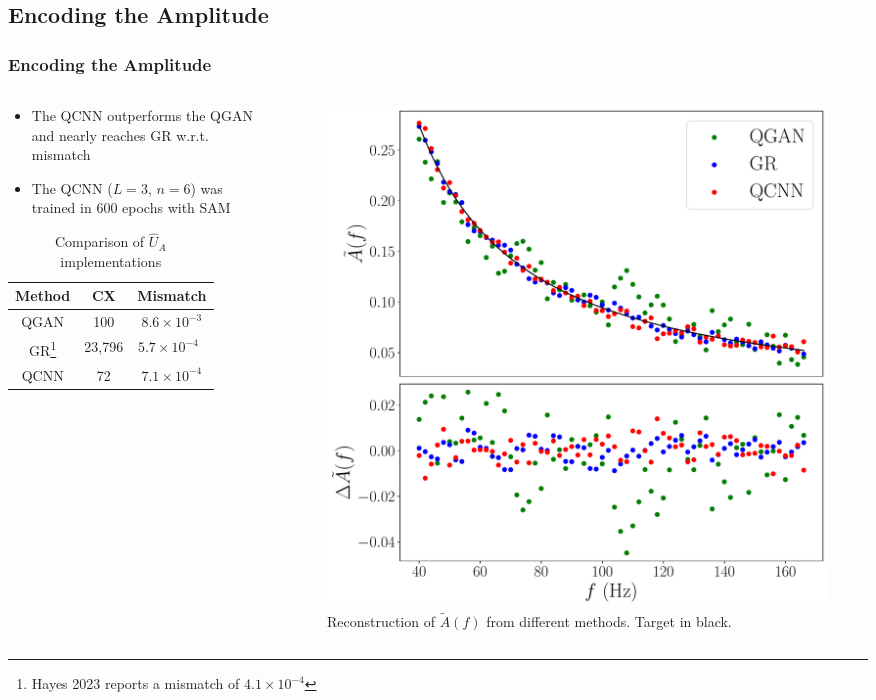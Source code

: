 \documentclass{beamer}
\begin{document}
\begin{frame}
\subsection{Encoding the Amplitude}
\frametitle{Encoding the Amplitude}
\begin{columns}
\begin{column}{0.5\textwidth}
\begin{itemize}
\item The \alert{QCNN outperforms the QGAN} and \alert{nearly reaches GR} w.r.t. mismatch 
\item The QCNN ($L=3$, $n=6$) was trained in 600 epochs with SAM
\end{itemize}
\vspace{0.4cm}
\begin{table}
\centering 
\begin{tabular}{c| c| c}
\textbf{Method} & \textbf{CX} & \textbf{Mismatch}  \\ \hline  
QGAN & 100 & $8.6\times10^{-3}$   \\
GR\footnote[frame]{Hayes 2023 reports a mismatch of $4.1\times 10^{-4}$} & 23,796 & $5.7\times10^{-4}$ $\,$  \\
QCNN  & 72 & $7.1\times10^{-4}$
\end{tabular}
\caption{Comparison of $\hat{U}_A$ implementations}
\end{table}
\end{column}
\begin{column}{0.5\textwidth} 
\begin{figure}[h]
\centering
\includegraphics[width=\textwidth]{im/amplitude_comp}
\caption{Reconstruction of $\tilde{A}(f)$ from different methods. Target in black.}
\end{figure}
\end{column}
\end{columns}
\end{frame}
\end{document}
